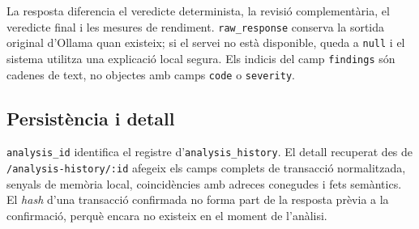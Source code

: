 La resposta diferencia el veredicte determinista, la revisió complementària, el veredicte final i les mesures de rendiment. \texttt{raw\_response} conserva la sortida original d'Ollama quan existeix; si el servei no està disponible, queda a \texttt{null} i el sistema utilitza una explicació local segura. Els indicis del camp \texttt{findings} són cadenes de text, no objectes amb camps \texttt{code} o \texttt{severity}.

\subsection{Persistència i detall}

\texttt{analysis\_id} identifica el registre d'\texttt{analysis\_history}. El detall recuperat des de \texttt{/analysis-history/:id} afegeix els camps complets de transacció normalitzada, senyals de memòria local, coincidències amb adreces conegudes i fets semàntics. El \textit{hash} d'una transacció confirmada no forma part de la resposta prèvia a la confirmació, perquè encara no existeix en el moment de l'anàlisi.
